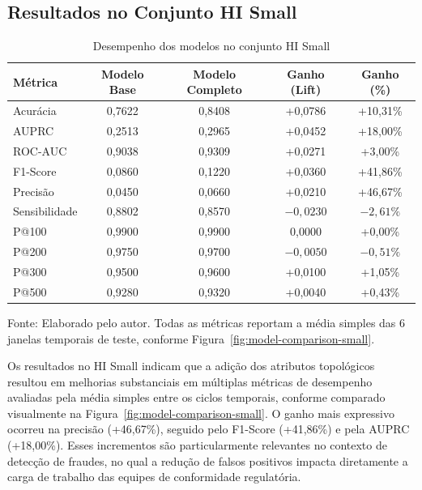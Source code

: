 \documentclass[titlepage,a4paper,oneside,onecolumn,12pt]{report}
\newcommand{\source}[1]{\par\noindent\footnotesize Fonte: #1\par}
\begin{document}
\subsection{Resultados no Conjunto HI Small}

\begin{table}
    \centering
    \caption{Desempenho dos modelos no conjunto HI Small}
    \label{tab:model-summary-small}
    \begin{tabular}{lSSSS}
        \hline
        \textbf{Métrica} & {\textbf{Modelo Base}} & {\textbf{Modelo Completo}} & {\textbf{Ganho (Lift)}} & {\textbf{Ganho (\%)}} \\
        \hline
        Acurácia & 0,7622 & 0,8408 & +0,0786 & +10,31{\%} \\
        AUPRC & 0,2513 & 0,2965 & +0,0452 & +18,00{\%} \\
        ROC-AUC & 0,9038 & 0,9309 & +0,0271 & +3,00{\%} \\
        F1-Score & 0,0860 & 0,1220 & +0,0360 & +41,86{\%} \\
        Precisão & 0,0450 & 0,0660 & +0,0210 & +46,67{\%} \\
        Sensibilidade & 0,8802 & 0,8570 & $-0,0230$ & $-2,61\%$ \\
        \hline
        P@100 & 0,9900 & 0,9900 & 0,0000 & +0,00{\%} \\
        P@200 & 0,9750 & 0,9700 & $-0,0050$ & $-0,51\%$ \\
        P@300 & 0,9500 & 0,9600 & +0,0100 & +1,05{\%} \\
        P@500 & 0,9280 & 0,9320 & +0,0040 & +0,43{\%} \\
        \hline
    \end{tabular}
    \source{Elaborado pelo autor. Todas as métricas reportam a média simples das 6 janelas temporais de teste, conforme Figura~\ref{fig:model-comparison-small}.}
\end{table}

Os resultados no HI Small indicam que a adição dos atributos topológicos resultou em melhorias substanciais em múltiplas métricas de desempenho avaliadas pela média simples entre os ciclos temporais, conforme comparado visualmente na Figura~\ref{fig:model-comparison-small}. O ganho mais expressivo ocorreu na precisão (+46,67\%), seguido pelo F1-Score (+41,86\%) e pela AUPRC (+18,00\%). Esses incrementos são particularmente relevantes no contexto de detecção de fraudes, no qual a redução de falsos positivos impacta diretamente a carga de trabalho das equipes de conformidade regulatória.
\end{document}
